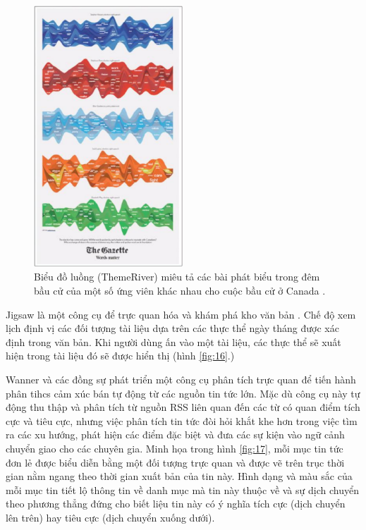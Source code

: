 \documentclass[14pt, a4paper]{article}
\numberwithin{equation}{section}
\numberwithin{figure}{section}
\numberwithin{dl}{section}
\numberwithin{md}{section}
\numberwithin{bd}{section}
\numberwithin{dn}{section}
\numberwithin{hq}{section}
\begin{document}
    \begin{figure}[h!]
        \centering
        \includegraphics[width=0.5\textwidth]{15.png}
        \caption{Biểu đồ luồng (ThemeRiver) miêu tả các bài phát biểu trong đêm bầu cử của một số ứng viên khác nhau cho cuộc bầu cử ở Canada \cite{173}.}
        \label{fig:15}
    \end{figure}

    Jigsaw là một công cụ để trực quan hóa và khám phá kho văn bản \cite{155}.
    Chế độ xem lịch định vị các đối tượng tài liệu dựa trên các thực thể ngày tháng được xác định trong văn bản.
    Khi người dùng ấn vào một tài liệu, các thực thể sẽ xuất hiện trong tài liệu đó sẽ được hiển thị (hình \ref{fig:16}.)

    Wanner và các đồng sự phát triển một công cụ phân tích trực quan để tiến hành phân tihcs cảm xúc bán tự động từ các nguồn tin tức lớn.
    Mặc dù công cụ này tự động thu thập và phân tích từ nguồn RSS liên quan đến các từ có quan điểm tích cực và tiêu cực, nhưng việc phân tích tin tức đòi hỏi khắt khe hơn trong việc tìm ra các xu hướng, phát hiện các điểm đặc biệt và đưa các sự kiện vào ngữ cảnh chuyển giao cho các chuyên gia.
    Minh họa trong hình \ref{fig:17}, mỗi mục tin tức đơn lẻ được biểu diễn bằng một đối tượng trực quan và được vẽ trên trục thời gian nằm ngang theo thời gian xuất bản của tin này.
    Hình dạng và màu sắc của mỗi mục tin tiết lộ thông tin về danh mục mà tin này thuộc về và sự dịch chuyển theo phương thẳng đứng cho biết liệu tin này có ý nghĩa tích cực (dịch chuyển lên trên) hay tiêu cực (dịch chuyển xuống dưới).
\end{document}
